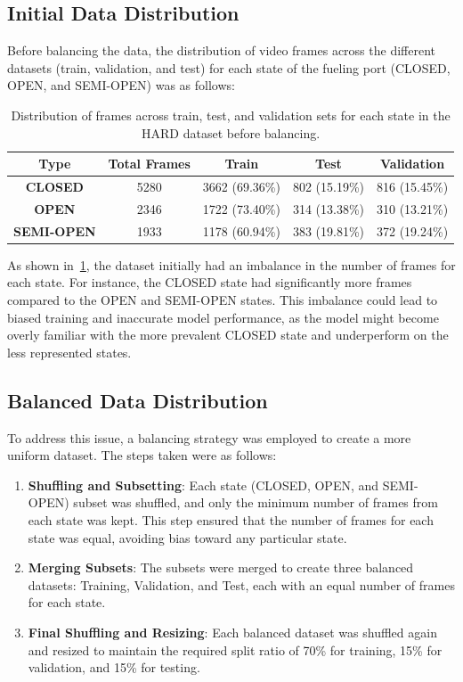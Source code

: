 \documentclass[12pt,oneside]{book} %
\begin{document}
\subsection{Initial Data Distribution}
Before balancing the data, the distribution of video frames across the
different datasets (train, validation, and test) for each state of the fueling
port (CLOSED, OPEN, and SEMI-OPEN) was as follows:
\begin{table}[H]
    \centering
    \begin{tabular}{@{}ccccc@{}}
        \toprule
        \textbf{Type}      & \textbf{Total Frames} & \textbf{Train} & \textbf{Test} & \textbf{Validation} \\ \midrule
        \textbf{CLOSED}    & 5280                  & 3662 (69.36\%) & 802 (15.19\%) & 816 (15.45\%)       \\ 
        \textbf{OPEN}      & 2346                  & 1722 (73.40\%) & 314 (13.38\%) & 310 (13.21\%)       \\ 
        \textbf{SEMI-OPEN} & 1933                  & 1178 (60.94\%) & 383 (19.81\%) & 372 (19.24\%)       \\ \bottomrule
    \end{tabular}
    \caption{\centering Distribution of frames across train, test, and validation sets for each state in the HARD dataset before balancing.}
    \label{tab:frame_distribution}
\end{table}

As shown in~\ref{tab:frame_distribution}, the dataset initially had an
imbalance in the number of frames for each state. For instance, the CLOSED
state had significantly more frames compared to the OPEN and SEMI-OPEN states.
This imbalance could lead to biased training and inaccurate model performance,
as the model might become overly familiar with the more prevalent CLOSED state
and underperform on the less represented states.

\subsection{Balanced Data Distribution}
To address this issue, a balancing strategy was employed to create a more
uniform dataset. The steps taken were as follows:
\begin{enumerate}
    \item \textbf{Shuffling and Subsetting}: Each state (CLOSED, OPEN, and SEMI-OPEN) subset was shuffled, and only the minimum number of frames from each state was kept. This step ensured that the number of frames for each state was equal, avoiding bias toward any particular state.
    \item \textbf{Merging Subsets}: The subsets were merged to create three balanced datasets: Training, Validation, and Test, each with an equal number of frames for each state.
    \item \textbf{Final Shuffling and Resizing}: Each balanced dataset was shuffled again and resized to maintain the required split ratio of 70\% for training, 15\% for validation, and 15\% for testing.
\end{enumerate}
\end{document}
